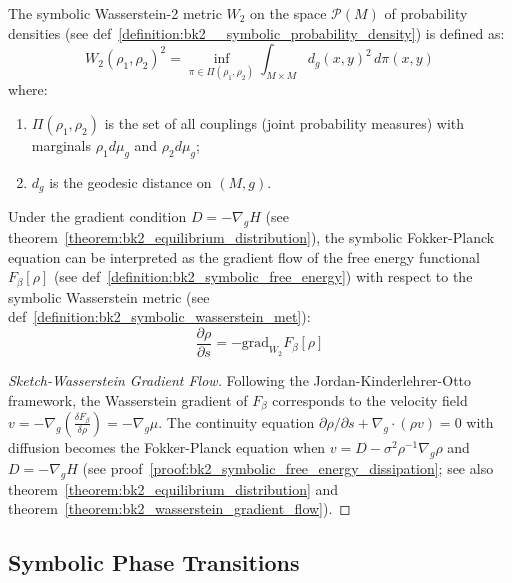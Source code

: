 \begin{definition} 
\label{definition:bk2_symbolic_wasserstein_met} 
The symbolic Wasserstein-2 metric $W_2$ on the space $\mathcal{P}(M)$ of probability densities (see def~\ref{definition:bk2__symbolic_probability_density}) is defined as:
\[
W_2(\rho_1, \rho_2)^2 = \inf_{\pi \in \Pi(\rho_1, \rho_2)} \int_{M \times M} d_g(x,y)^2 \, d\pi(x,y)
\]
where:
\begin{enumerate}
    \item $\Pi(\rho_1, \rho_2)$ is the set of all couplings (joint probability measures) with marginals $\rho_1 d\mu_g$ and $\rho_2 d\mu_g$;
    \item $d_g$ is the geodesic distance on $(M,g)$.
\end{enumerate}
\end{definition}

\begin{theorem} 
\label{theorem:bk2_wasserstein_gradient_flow} 
Under the gradient condition $D = -\nabla_g H$ (see theorem~\ref{theorem:bk2_equilibrium_distribution}), the symbolic Fokker-Planck equation can be interpreted as the gradient flow of the free energy functional $F_\beta[\rho]$ (see def~\ref{definition:bk2_symbolic_free_energy}) with respect to the symbolic Wasserstein metric (see def~\ref{definition:bk2_symbolic_wasserstein_met}):
\[
\frac{\partial \rho}{\partial s} = -\text{grad}_{W_2} F_\beta[\rho]
\]
\end{theorem}

\begin{proof}[Sketch-Wasserstein Gradient Flow]
\label{proof:bk2_sketch_wasserstein_gradient_flow}
Following the Jordan-Kinderlehrer-Otto framework, the Wasserstein gradient of $F_\beta$ corresponds to the velocity field $v = -\nabla_g \left( \frac{\delta F_\beta}{\delta \rho} \right) = -\nabla_g \mu$. The continuity equation $\partial \rho / \partial s + \nabla_g \cdot (\rho v) = 0$ with diffusion becomes the Fokker-Planck equation when $v = D - \sigma^2 \rho^{-1} \nabla_g \rho$ and $D = -\nabla_g H$ (see proof~\ref{proof:bk2_symbolic_free_energy_dissipation}; see also theorem~\ref{theorem:bk2_equilibrium_distribution} and theorem~\ref{theorem:bk2_wasserstein_gradient_flow}).
\end{proof}

\subsection{Symbolic Phase Transitions}
\label{subsec:bk2_symbolic_phase_transitions}

